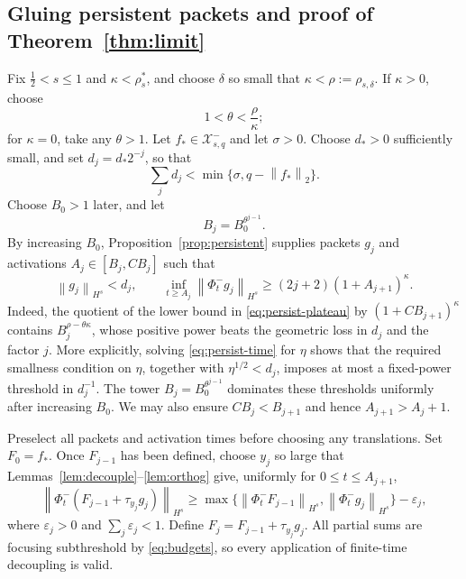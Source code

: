\documentclass[10pt,a4paper]{amsart}
\numberwithin{equation}{section}
\newcommand{\X}{\mathcal X}
\newcommand{\eps}{\varepsilon}
\newcommand{\half}{\frac12}
\newcommand{\norm}[1]{\left\lVert #1\right\rVert}
\newcommand{\flow}[1]{\Phi^{#1}}
\newcommand{\trans}[1]{\tau_{#1}}
\begin{document}
\subsection{Gluing persistent packets and proof of Theorem~\ref{thm:limit}}

Fix $\half<s\leq1$ and $\kappa<\rho_s^*$, and choose $\delta$ so small that
$\kappa<\rho:=\rho_{s,\delta}$.  If $\kappa>0$, choose
\begin{equation}\label{eq:theta}
 1<\theta<\frac\rho\kappa;
\end{equation}
for $\kappa=0$, take any $\theta>1$.  Let $f_*\in\X^-_{s,q}$ and let
$\sigma>0$.  Choose $d_*>0$ sufficiently small, and set $d_j=d_*2^{-j}$, so
that
\begin{equation}\label{eq:budgets}
 \sum_jd_j<\min\{\sigma,q-\norm{f_*}_2\}.
\end{equation}
Choose $B_0>1$ later, and let
\begin{equation}\label{eq:targets}
 B_j=B_0^{\theta^{j-1}}.
\end{equation}
By increasing $B_0$, Proposition~\ref{prop:persistent} supplies packets
$g_j$ and activations $A_j\in[B_j,CB_j]$ such that
\begin{equation}\label{eq:scheduled}
 \norm{g_j}_{H^s}<d_j,
 \qquad
 \inf_{t\geq A_j}\norm{\flow-_tg_j}_{H^s}
 \geq(2j+2)(1+A_{j+1})^\kappa.
\end{equation}
Indeed, the quotient of the lower bound in
\eqref{eq:persist-plateau} by $(1+CB_{j+1})^\kappa$ contains
$B_j^{\rho-\theta\kappa}$, whose positive power beats the geometric loss in
$d_j$ and the factor $j$.  More explicitly, solving
\eqref{eq:persist-time} for $\eta$ shows that the required smallness
condition on $\eta$, together with $\eta^{1/2}<d_j$, imposes at most a
fixed-power threshold in $d_j^{-1}$.  The tower
$B_j=B_0^{\theta^{j-1}}$ dominates these thresholds uniformly after increasing
$B_0$.  We may also ensure
$CB_j<B_{j+1}$ and hence $A_{j+1}>A_j+1$.

Preselect all packets and activation times before choosing any translations.
Set $F_0=f_*$.  Once $F_{j-1}$ has been defined, choose $y_j$ so large that
Lemmas~\ref{lem:decouple}--\ref{lem:orthog} give, uniformly for
$0\leq t\leq A_{j+1}$,
\begin{equation}\label{eq:stage-lower}
 \norm{\flow-_t(F_{j-1}+\trans{y_j}g_j)}_{H^s}
 \geq
 \max\{\norm{\flow-_tF_{j-1}}_{H^s},
 \norm{\flow-_tg_j}_{H^s}\}-\eps_j,
\end{equation}
where $\eps_j>0$ and $\sum_j\eps_j<1$.  Define
$F_j=F_{j-1}+\trans{y_j}g_j$.  All partial sums are focusing subthreshold by
\eqref{eq:budgets}, so every application of finite-time decoupling is valid.
\end{document}
